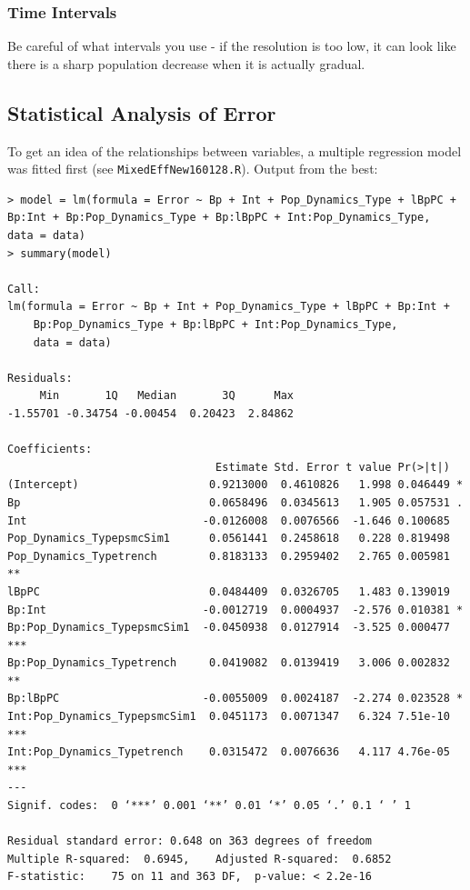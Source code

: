 \documentclass[11pt,a4paper]{article}
\begin{document}
\subsubsection{Time Intervals}
Be careful of what intervals you use - if the resolution is too low, it can look like there is a sharp population decrease when it is actually gradual.

\subsection{Statistical Analysis of Error}
To get an idea of the relationships between variables, a multiple regression model was fitted first (see \verb|MixedEffNew160128.R|). Output from the best:
\begin{lstlisting}
> model = lm(formula = Error ~ Bp + Int + Pop_Dynamics_Type + lBpPC + Bp:Int + Bp:Pop_Dynamics_Type + Bp:lBpPC + Int:Pop_Dynamics_Type,  data = data)
> summary(model)

Call:
lm(formula = Error ~ Bp + Int + Pop_Dynamics_Type + lBpPC + Bp:Int + 
    Bp:Pop_Dynamics_Type + Bp:lBpPC + Int:Pop_Dynamics_Type, 
    data = data)

Residuals:
     Min       1Q   Median       3Q      Max 
-1.55701 -0.34754 -0.00454  0.20423  2.84862 

Coefficients:
                                Estimate Std. Error t value Pr(>|t|)    
(Intercept)                    0.9213000  0.4610826   1.998 0.046449 *  
Bp                             0.0658496  0.0345613   1.905 0.057531 .  
Int                           -0.0126008  0.0076566  -1.646 0.100685    
Pop_Dynamics_TypepsmcSim1      0.0561441  0.2458618   0.228 0.819498    
Pop_Dynamics_Typetrench        0.8183133  0.2959402   2.765 0.005981 ** 
lBpPC                          0.0484409  0.0326705   1.483 0.139019    
Bp:Int                        -0.0012719  0.0004937  -2.576 0.010381 *  
Bp:Pop_Dynamics_TypepsmcSim1  -0.0450938  0.0127914  -3.525 0.000477 ***
Bp:Pop_Dynamics_Typetrench     0.0419082  0.0139419   3.006 0.002832 ** 
Bp:lBpPC                      -0.0055009  0.0024187  -2.274 0.023528 *  
Int:Pop_Dynamics_TypepsmcSim1  0.0451173  0.0071347   6.324 7.51e-10 ***
Int:Pop_Dynamics_Typetrench    0.0315472  0.0076636   4.117 4.76e-05 ***
---
Signif. codes:  0 ‘***’ 0.001 ‘**’ 0.01 ‘*’ 0.05 ‘.’ 0.1 ‘ ’ 1

Residual standard error: 0.648 on 363 degrees of freedom
Multiple R-squared:  0.6945,	Adjusted R-squared:  0.6852 
F-statistic:    75 on 11 and 363 DF,  p-value: < 2.2e-16
\end{lstlisting}
\end{document}
